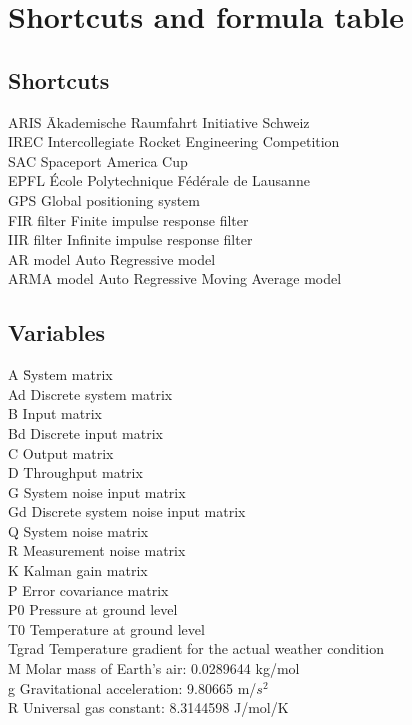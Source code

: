 \chapter{Shortcuts and formula table}
\section{Shortcuts}
\begin{tabbing}
 ARIS    \hspace{5cm} \= Akademische Raumfahrt Initiative Schweiz \\
 IREC 		\> Intercollegiate Rocket Engineering Competition \\
 SAC		\> Spaceport America Cup \\
 EPFL	  	\> École Polytechnique Fédérale de Lausanne \\
 GPS 		\> Global positioning system \\
 FIR filter 	\> Finite impulse response filter\\
 IIR filter 	\> Infinite impulse response filter\\
 AR model 	\> Auto Regressive model\\
 ARMA model 	\> Auto Regressive Moving Average model \\


\end{tabbing}

\section{Variables}
\begin{tabbing}
 A \hspace{5cm}	\= System matrix \\
 Ad 		\> Discrete system matrix \\
 B 		\> Input matrix \\
 Bd 		\> Discrete input matrix \\
 C 		\> Output matrix \\
 D 		\> Throughput matrix \\
 G 		\> System noise input matrix \\
 Gd 		\> Discrete system noise input matrix \\
 Q 		\> System noise matrix \\
 R 		\> Measurement noise matrix \\
 K 		\> Kalman gain matrix \\
 P 		\> Error covariance matrix \\ 
 P0 		\> Pressure at ground level \\
 T0 		\> Temperature at ground level \\
 Tgrad 		\> Temperature gradient for the actual weather condition \\
 M 		\> Molar mass of Earth's air: 0.0289644 kg/mol\\
 g 		\> Gravitational acceleration: 9.80665 m/$s^2$\\
 R 		\> Universal gas constant: 8.3144598 J/mol/K\\

\end{tabbing}

